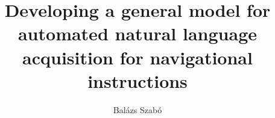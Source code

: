\documentclass[runningheads]{llncs}
\begin{document}
%
\title{Developing a general model for automated natural language acquisition for navigational instructions }
%
%
\author{Balázs Szabó \\ }
%
%

%
\maketitle              %
%
\begin{abstract}


\end{abstract}








\printbibliography
\end{document}
